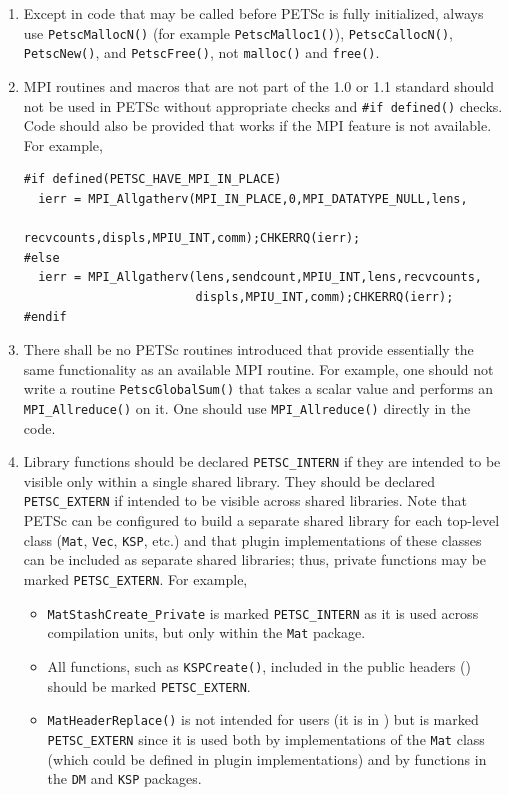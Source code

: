 \begin{enumerate}
\begin{lstlisting}
\end{lstlisting}
\item Except in code that may be called before PETSc is fully initialized, always use \lstinline{PetscMallocN()} (for example \lstinline{PetscMalloc1()}), \lstinline{PetscCallocN()}, \lstinline{PetscNew()}, and \lstinline{PetscFree()}, not \lstinline{malloc()} and \lstinline{free()}.
\item MPI routines and macros that are not part of the 1.0 or 1.1 standard should not be used in PETSc without appropriate  checks and \lstinline{#if defined()} checks. 
 Code should also be provided that works if the MPI feature is not available. For example, 
\begin{lstlisting}
#if defined(PETSC_HAVE_MPI_IN_PLACE)
  ierr = MPI_Allgatherv(MPI_IN_PLACE,0,MPI_DATATYPE_NULL,lens,
                        recvcounts,displs,MPIU_INT,comm);CHKERRQ(ierr);
#else
  ierr = MPI_Allgatherv(lens,sendcount,MPIU_INT,lens,recvcounts,
                        displs,MPIU_INT,comm);CHKERRQ(ierr);
#endif
\end{lstlisting}
\item There shall be no PETSc routines introduced that provide essentially the same functionality as an available MPI routine. 
  For example, one should not write a routine \lstinline{PetscGlobalSum()} that takes a scalar value and performs an \lstinline{MPI_Allreduce()} on it. 
  One should use \lstinline{MPI_Allreduce()} directly in the code.
\item \label{styleitem:petscextern} Library functions should be declared \lstinline{PETSC_INTERN} if they are intended to be visible only within a single shared library. 
They should be declared \lstinline{PETSC_EXTERN} if intended to be visible across shared libraries. 
Note that PETSc can be configured to build a separate shared library for each top-level class (\lstinline{Mat}, \lstinline{Vec}, \lstinline{KSP}, etc.) and that plugin implementations of these classes can be included as separate shared libraries; thus, private functions may be marked \lstinline{PETSC_EXTERN}.
For example, 
\begin{itemize}
\item \lstinline{MatStashCreate_Private} is marked \lstinline{PETSC_INTERN} as it is used across compilation units, but only within the \lstinline{Mat} package.
\item All functions, such as \lstinline{KSPCreate()}, included in the public headers () should be marked \lstinline{PETSC_EXTERN}.
\item \lstinline{MatHeaderReplace()} is not intended for users (it is in ) but is marked \lstinline{PETSC_EXTERN} since it is used both by implementations of the \lstinline{Mat} class (which could be defined in plugin implementations) and by functions in the \lstinline{DM} and \lstinline{KSP} packages.
\end{itemize}
\end{enumerate}

